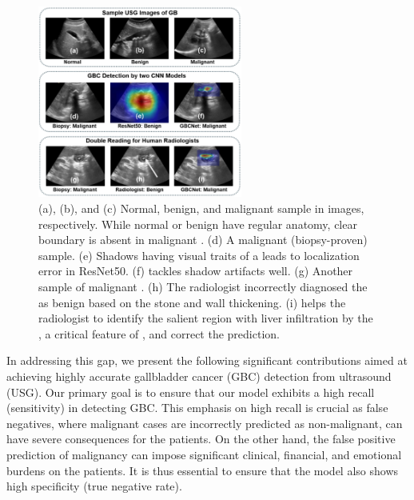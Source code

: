 \begin{figure}[t]
    \centering
    \includegraphics[width=0.6\textwidth]{figs/gbcnet/teaser.png}
    \caption[Depiction of issues with USG-based GBC detection]{(a), (b), and (c) Normal, benign, and malignant \gb sample in \usg images, respectively. While normal or benign \gb have regular anatomy, clear boundary is absent in malignant \gb. (d) A malignant (biopsy-proven) \gb sample. (e) Shadows having visual traits of a \gb leads to localization error in ResNet50. (f) \gbcnet tackles shadow artifacts well. (g) Another sample of malignant \gb. (h) The radiologist incorrectly diagnosed the \gb as benign based on the stone and wall thickening. (i) \gbcnet helps the radiologist to identify the salient region with liver infiltration by the \gb, a critical feature of \gbc, and correct the prediction.}
    \label{fig:teaser}
\end{figure}

\par In addressing this gap, we present the following significant contributions aimed at achieving highly accurate gallbladder cancer (GBC) detection from ultrasound (USG). Our primary goal is to ensure that our model exhibits a high recall (sensitivity) in detecting GBC. This emphasis on high recall is crucial as false negatives, where malignant cases are incorrectly predicted as non-malignant, can have severe consequences for the patients. On the other hand, the false positive prediction of malignancy can impose significant clinical, financial, and emotional burdens on the patients. It is thus essential to ensure that the model also shows high specificity (true negative rate).


